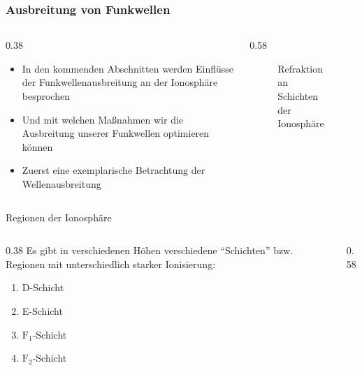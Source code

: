\begin{frame}
\frametitle{Ausbreitung von Funkwellen}
\begin{columns}
    \begin{column}{0.38\textwidth}
    \begin{itemize}
  \item In den kommenden Abschnitten werden Einflüsse der Funkwellenausbreitung an der Ionosphäre besprochen
  \item Und mit welchen Maßnahmen wir die Ausbreitung unserer Funkwellen optimieren können
  \item Zuerst eine exemplarische Betrachtung der Wellenausbreitung
  \end{itemize}

    \end{column}
   \begin{column}{0.58\textwidth}
       
\begin{figure}
    \caption{\scriptsize Refraktion an Schichten der Ionosphäre}
    \label{e_wellenausbreitung_refraktion}
\end{figure}

   \end{column}
\end{columns}

\end{frame}

\begin{frame}{Regionen der Ionosphäre}
    \begin{columns}
        \begin{column}{0.38\textwidth}
        Es gibt in verschiedenen Höhen verschiedene \enquote{Schichten} bzw. Regionen mit unterschiedlich starker Ionisierung:
        \begin{enumerate}
            \item[1] D-Schicht
            \item[2] E-Schicht
            \item[3] $\text{F}_1$-Schicht
            \item[4] $\text{F}_2$-Schicht
        \end{enumerate}
        \end{column}
        \begin{column}{0.58\textwidth}
        \end{column}
    \end{columns}
\end{frame}

